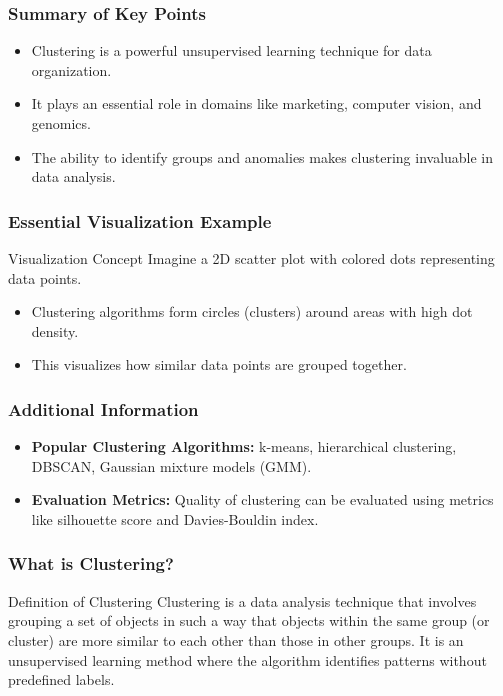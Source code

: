 \documentclass[aspectratio=169]{beamer}
\begin{document}
\begin{frame}[fragile]
    \frametitle{Summary of Key Points}
    \begin{itemize}
        \item Clustering is a powerful unsupervised learning technique for data organization.
        \item It plays an essential role in domains like marketing, computer vision, and genomics.
        \item The ability to identify groups and anomalies makes clustering invaluable in data analysis.
    \end{itemize}
\end{frame}

\begin{frame}[fragile]
    \frametitle{Essential Visualization Example}
    \begin{block}{Visualization Concept}
        Imagine a 2D scatter plot with colored dots representing data points. 
        \begin{itemize}
            \item Clustering algorithms form circles (clusters) around areas with high dot density.
            \item This visualizes how similar data points are grouped together.
        \end{itemize}
    \end{block}
\end{frame}

\begin{frame}[fragile]
    \frametitle{Additional Information}
    \begin{itemize}
        \item \textbf{Popular Clustering Algorithms:} 
            k-means, hierarchical clustering, DBSCAN, Gaussian mixture models (GMM).
        \item \textbf{Evaluation Metrics:} 
            Quality of clustering can be evaluated using metrics like silhouette score and Davies-Bouldin index.
    \end{itemize}
\end{frame}

\begin{frame}[fragile]
    \frametitle{What is Clustering?}
    \begin{block}{Definition of Clustering}
        Clustering is a data analysis technique that involves grouping a set of objects in such a way that objects within the same group (or cluster) are more similar to each other than those in other groups. It is an unsupervised learning method where the algorithm identifies patterns without predefined labels.
    \end{block}
\end{frame}
\end{document}
